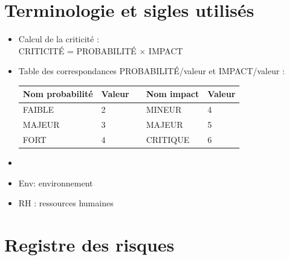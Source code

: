 \documentclass[a4paper,11pt,french]{article}
\begin{document}
\section{Terminologie et sigles utilisés}
\begin{itemize}
\item Calcul de la criticité :\\
{\centering CRITICITÉ = PROBABILITÉ $\times$ IMPACT}
\item Table des correspondances PROBABILITÉ/valeur et IMPACT/valeur :

\begin{center}
\begin{tabular}{|l|l|c|l|l|}
\hline
\textbf{Nom probabilité}&\textbf{Valeur}&&\textbf{Nom impact}&\textbf{Valeur}\\
\hline
FAIBLE&2&&MINEUR&4\\
\hline
MAJEUR&3&&MAJEUR&5\\
\hline
FORT&4&&CRITIQUE&6\\
\hline
\end{tabular}
\end{center}
\item []
\item Env: environnement
\item RH : ressources humaines
\end{itemize}
\section{Registre des risques}
\end{document}
